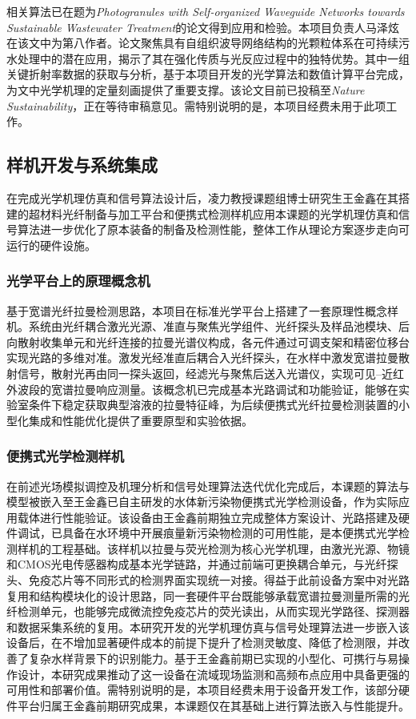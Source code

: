 \documentclass[12pt,a4paper]{article}
\begin{document}
相关算法已在题为\textit{Photogranules with Self-organized Waveguide Networks towards Sustainable Wastewater Treatment}的论文得到应用和检验。本项目负责人马泽炫在该文中为第八作者。论文聚焦具有自组织波导网络结构的光颗粒体系在可持续污水处理中的潜在应用，揭示了其在强化传质与光反应过程中的独特优势。其中一组关键折射率数据的获取与分析，基于本项目开发的光学算法和数值计算平台完成，为文中光学机理的定量刻画提供了重要支撑。该论文目前已投稿至\textit{Nature Sustainability}，正在等待审稿意见。需特别说明的是，本项目经费未用于此项工作。

\subsection{样机开发与系统集成}

在完成光学机理仿真和信号算法设计后，凌力教授课题组博士研究生王金鑫在其搭建的超材料光纤制备与加工平台和便携式检测样机应用本课题的光学机理仿真和信号算法进一步优化了原本装备的制备及检测性能，整体工作从理论方案逐步走向可运行的硬件设施。

\subsubsection{光学平台上的原理概念机}

基于宽谱光纤拉曼检测思路，本项目在标准光学平台上搭建了一套原理性概念样机。系统由光纤耦合激光光源、准直与聚焦光学组件、光纤探头及样品池模块、后向散射收集单元和光纤连接的拉曼光谱仪构成，各元件通过可调支架和精密位移台实现光路的多维对准。激发光经准直后耦合入光纤探头，在水样中激发宽谱拉曼散射信号，散射光再由同一探头返回，经滤光与聚焦后送入光谱仪，实现可见--近红外波段的宽谱拉曼响应测量。该概念机已完成基本光路调试和功能验证，能够在实验室条件下稳定获取典型溶液的拉曼特征峰，为后续便携式光纤拉曼检测装置的小型化集成和性能优化提供了重要原型和实验依据。

\subsubsection{便携式光学检测样机}

在前述光场模拟调控及机理分析和信号处理算法迭代优化完成后，本课题的算法与模型被嵌入至王金鑫已自主研发的水体新污染物便携式光学检测设备，作为实际应用载体进行性能验证。该设备由王金鑫前期独立完成整体方案设计、光路搭建及硬件调试，已具备在水环境中开展痕量新污染物检测的可用性能，是本便携式光学检测样机的工程基础。该样机以拉曼与荧光检测为核心光学机理，由激光光源、物镜和CMOS光电传感器构成基本光学链路，并通过前端可更换耦合单元，与光纤探头、免疫芯片等不同形式的检测界面实现统一对接。得益于此前设备方案中对光路复用和结构模块化的设计思路，同一套硬件平台既能够承载宽谱拉曼测量所需的光纤检测单元，也能够完成微流控免疫芯片的荧光读出，从而实现光学路径、探测器和数据采集系统的复用。本研究开发的光学机理仿真与信号处理算法进一步嵌入该设备后，在不增加显著硬件成本的前提下提升了检测灵敏度、降低了检测限，并改善了复杂水样背景下的识别能力。基于王金鑫前期已实现的小型化、可携行与易操作设计，本研究成果推动了这一设备在流域现场监测和高频布点应用中具备更强的可用性和部署价值。需特别说明的是，本项目经费未用于设备开发工作，该部分硬件平台归属王金鑫前期研究成果，本课题仅在其基础上进行算法嵌入与性能提升。
\end{document}

